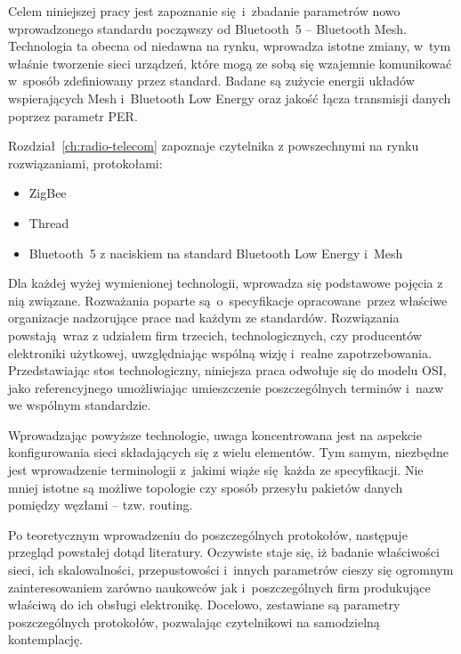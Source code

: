 Celem niniejszej pracy jest zapoznanie się i~zbadanie parametrów nowo wprowadzonego standardu począwszy
od Bluetooth~5 -- Bluetooth Mesh. Technologia ta obecna od niedawna na rynku, wprowadza istotne
zmiany, w~tym właśnie tworzenie sieci urządzeń, które mogą ze sobą się wzajemnie komunikować w~sposób
zdefiniowany przez standard. Badane są zużycie energii układów wspierających Mesh i~Bluetooth
Low Energy oraz jakość łącza transmisji danych poprzez parametr \gls{PER}.

Rozdział~\ref{ch:radio-telecom} zapoznaje czytelnika z powszechnymi na rynku rozwiązaniami, protokołami:
\begin{itemize}
\item ZigBee
\item Thread
\item Bluetooth~5 z naciskiem na standard Bluetooth Low Energy i~Mesh
\end{itemize}

Dla każdej wyżej wymienionej technologii, wprowadza się podstawowe pojęcia z nią związane. Rozważania
poparte są o~specyfikacje opracowane przez właściwe organizacje nadzorujące prace nad każdym ze
standardów. Rozwiązania powstają wraz z udziałem firm trzecich, technologicznych, czy producentów
elektroniki użytkowej, uwzględniając wspólną wizję i~realne zapotrzebowania. Przedstawiając
stos technologiczny, niniejsza praca odwołuje się do modelu \gls{OSI}, jako referencyjnego umożliwiając
umieszczenie poszczególnych terminów i~nazw we wspólnym standardzie.

Wprowadzając powyższe technologie, uwaga koncentrowana jest na aspekcie konfigurowania sieci
składających się z wielu elementów. Tym samym, niezbędne jest wprowadzenie terminologii z~jakimi
wiąże się każda ze specyfikacji. Nie mniej istotne są możliwe topologie czy sposób przesyłu
pakietów danych pomiędzy węzłami -- tzw. routing.

Po teoretycznym wprowadzeniu do poszczególnych protokołów, następuje przegląd powstałej dotąd
literatury. Oczywiste staje się, iż badanie właściwości sieci, ich skalowalności, przepustowości
i~innych parametrów cieszy się ogromnym zainteresowaniem zarówno naukowców jak i~poszczególnych
firm produkujące właściwą do ich obsługi elektronikę. Docelowo, zestawiane są parametry poszczególnych
protokołów, pozwalając czytelnikowi na samodzielną kontemplację.

